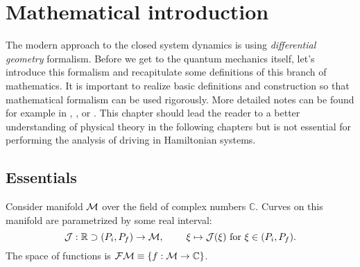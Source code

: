 \chapter{Mathematical introduction}
\label{chap:mathIntro}
The modern approach to the closed system dynamics is using \emph{differential geometry} formalism. Before we get to the quantum mechanics itself, let's introduce this formalism and recapitulate some definitions of this branch of mathematics. It is important to realize basic definitions and construction so that mathematical formalism can be used rigorously. More detailed notes can be found for example in \citet{krtous}, \citet{lu}, or \citet{fecko}. This chapter should lead the reader to a better understanding of physical theory in the following chapters but is not essential for performing the analysis of driving in Hamiltonian systems.
\section{Essentials}
Consider manifold $\mathcal{M}$ over the field of complex numbers $\mathbb C$. Curves on this manifold are parametrized by some real interval:
$$\mathcal J:\mathbb{R} \supset (P_i,P_f) \rightarrow \mathcal{M},\; \qquad \xi\mapsto \mathcal J(\xi) \text{  for } \xi \in (P_i,P_f) .$$ 
The space of functions is $\mathcal{FM}\equiv\{f:\mathcal{M}\rightarrow \mathbb{C}\}$.



